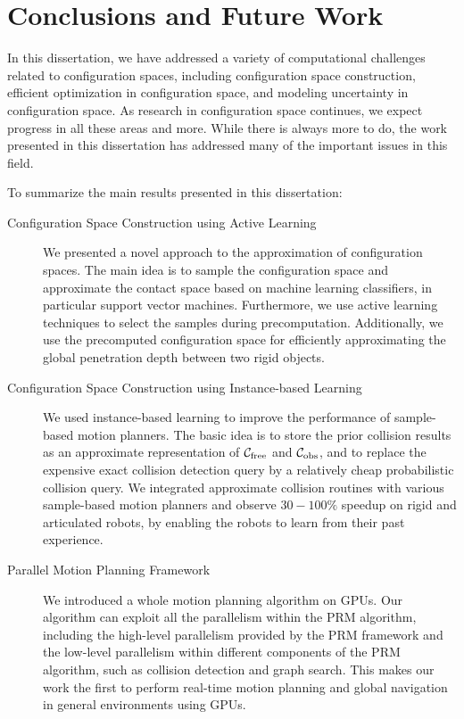 \chapter{Conclusions and Future Work}
\label{chp:Conclusion}
In this dissertation, we have addressed a variety of computational challenges related to configuration spaces, including configuration space construction, efficient optimization in configuration space, and modeling uncertainty in configuration space. As research in configuration space continues, we expect progress in all these areas and more. While there is always more to do, the work presented in this dissertation has addressed many of the important issues in this field.

To summarize the main results presented in this dissertation:
\begin{description}
\item[Configuration Space Construction using Active Learning] We presented a novel approach to the approximation of configuration spaces. The main idea is to sample the configuration space and approximate the contact space based on machine learning classifiers, in particular support vector machines.
Furthermore, we use active learning techniques to select the samples during precomputation. Additionally, we use the precomputed configuration space for efficiently approximating the global penetration depth between two rigid objects.
\item[Configuration Space Construction using Instance-based Learning] We used instance-based learning to improve the performance of sample-based motion planners. The basic idea is to store the prior collision results as an approximate representation of $\mathcal C_{\text{free}}$ and $\mathcal C_{\text{obs}}$, and to replace the expensive exact collision detection query by a relatively cheap probabilistic collision query. We integrated approximate collision routines with various sample-based motion planners and observe $30-100\%$ speedup on rigid and articulated robots, by enabling the robots to learn from their past experience.
\item[Parallel Motion Planning Framework] We introduced a whole motion planning algorithm on GPUs. Our algorithm can exploit all the parallelism within the PRM algorithm, including the high-level parallelism provided by the PRM framework and the low-level parallelism within different components of the PRM algorithm, such as collision detection and graph search. This makes our work the first to perform real-time motion planning and global navigation in general environments using GPUs.

\end{description}
